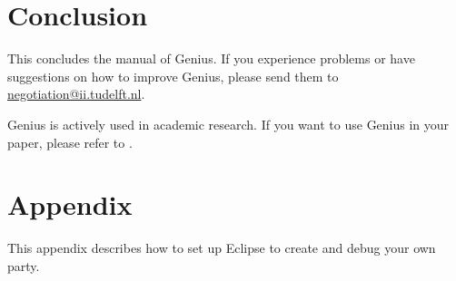\documentclass[]{article}
\newcommand\Genius{{\sc Genius}}
\begin{document}
\FloatBarrier






\section{Conclusion}
This concludes the manual of {\Genius}. If you experience problems or have suggestions on how to improve {\Genius}, please send them to \url{negotiation@ii.tudelft.nl}. 

{\Genius} is actively used in academic research. If you want to use {\Genius} in your paper, please refer to \cite{Genius}.


\newpage
\section{Appendix}
This appendix describes how to set up Eclipse to create and debug your own party.

\label{sec:appendix}
\end{document}
